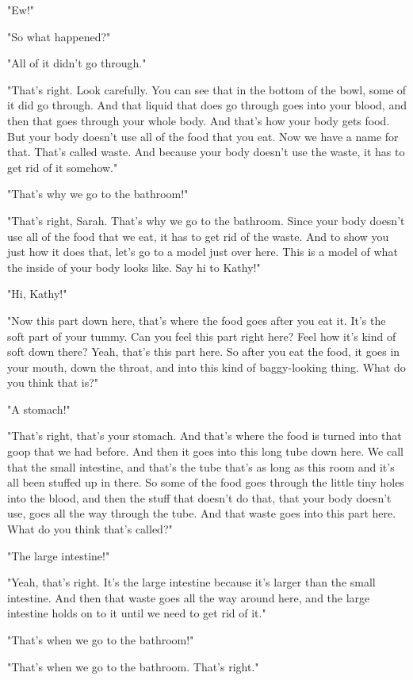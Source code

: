 "Ew!"

"So what happened?"

"All of it didn't go through."

"That's right. Look carefully. You can see that in the bottom of the bowl, some of it did go through. And that liquid that does go through goes into your blood, and then that goes through your whole body. And that's how your body gets food. But your body doesn't use all of the food that you eat. Now we have a name for that. That's called waste. And because your body doesn't use the waste, it has to get rid of it somehow."

"That's why we go to the bathroom!"

"That's right, Sarah. That's why we go to the bathroom. Since your body doesn't use all of the food that we eat, it has to get rid of the waste. And to show you just how it does that, let's go to a model just over here. This is a model of what the inside of your body looks like. Say hi to Kathy!"

"Hi, Kathy!"

"Now this part down here, that's where the food goes after you eat it. It's the soft part of your tummy. Can you feel this part right here? Feel how it's kind of soft down there? Yeah, that's this part here. So after you eat the food, it goes in your mouth, down the throat, and into this kind of baggy-looking thing. What do you think that is?"

"A stomach!"

"That's right, that's your stomach. And that's where the food is turned into that goop that we had before. And then it goes into this long tube down here. We call that the small intestine, and that's the tube that's as long as this room and it's all been stuffed up in there. So some of the food goes through the little tiny holes into the blood, and then the stuff that doesn't do that, that your body doesn't use, goes all the way through the tube. And that waste goes into this part here. What do you think that's called?"

"The large intestine!"

"Yeah, that's right. It's the large intestine because it's larger than the small intestine. And then that waste goes all the way around here, and the large intestine holds on to it until we need to get rid of it."

"That's when we go to the bathroom!"

"That's when we go to the bathroom. That's right."

